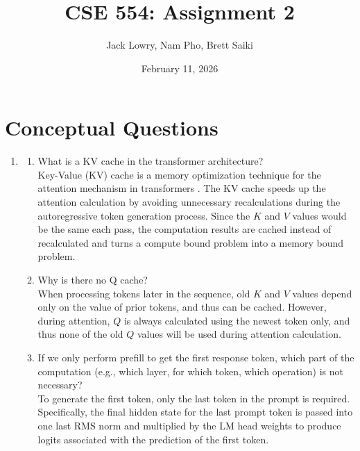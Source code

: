 \documentclass[12pt]{article}
\title{CSE 554: Assignment 2}
\author{Jack Lowry, Nam Pho, Brett Saiki}
\date{February 11, 2026}
\begin{document}
\pagestyle{fancy}

\fancyhead{} %

\fancyfoot{} %
\fancyfoot[CO]{\thepage}

\maketitle

\section{Conceptual Questions}

\begin{enumerate}[label=\textbf{Q\arabic*.}]
    \item 
    \begin{enumerate}
        \item What is a KV cache in the transformer architecture? \\

        Key-Value (KV) cache is a memory optimization technique for the attention mechanism in transformers \cite{kv}. The KV cache speeds up the attention calculation by avoiding unnecessary recalculations during the autoregressive token generation process. Since the $K$ and $V$ values would be the same each pass, the computation results are cached instead of recalculated and turns a compute bound problem into a memory bound problem. \\

        \item Why is there no Q cache? \\

        When processing tokens later in the sequence, old $K$ and $V$ values depend only on the value of prior tokens, and thus can be cached. However, during attention, $Q$ is always calculated using the newest token only, and thus none of the old $Q$ values will be used during attention calculation. \\

        \item If we only perform prefill to get the first response token, which part of the computation (e.g., which layer, for which token, which operation) is not necessary? \\

        To generate the first token, only the last token in the prompt is required. Specifically, the final hidden state for the last prompt token is passed into one last RMS norm and multiplied by the LM head weights to produce logits associated with the prediction of the first token. \\


\end{enumerate}
\end{enumerate}
\end{document}

